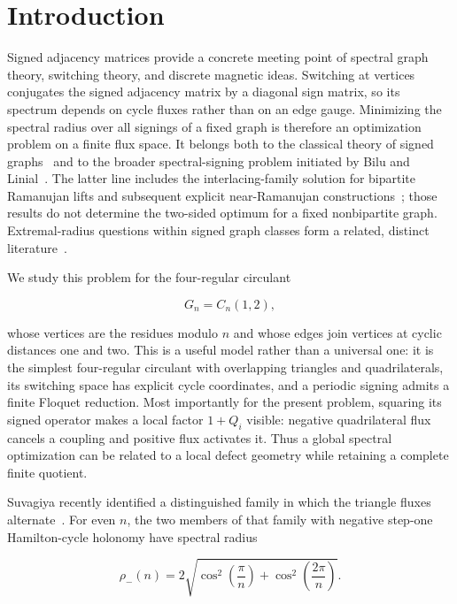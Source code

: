 \section{Introduction}\label{sec:introduction}

Signed adjacency matrices provide a concrete meeting point of spectral graph
theory, switching theory, and discrete magnetic ideas. Switching at vertices
conjugates the signed adjacency matrix by a diagonal sign matrix, so its
spectrum depends on cycle fluxes rather than on an edge gauge. Minimizing the
spectral radius over all signings of a fixed graph is therefore an optimization
problem on a finite flux space. It belongs both to the classical theory of
signed graphs~\cite{Zaslavsky1982} and to the broader spectral-signing problem
initiated by Bilu and Linial~\cite{BiluLinial2006}. The latter line includes the
interlacing-family solution for bipartite Ramanujan lifts and subsequent
explicit near-Ramanujan constructions~\cite{MarcusSpielmanSrivastava2015,MohantyODonnellParedes2022};
those results do not determine the two-sided optimum for a fixed nonbipartite
graph. Extremal-radius questions within signed graph classes form a related,
distinct literature~\cite{BelardoCioabaKoolenWang2019,BelardoBrunettiCiampella2021}.

We study this problem for the four-regular circulant

\begin{equation}
G_n=C_n(1,2),
\end{equation}

whose vertices are the residues modulo \(n\) and whose edges join vertices at
cyclic distances one and two. This is a useful model rather than a universal
one: it is the simplest four-regular circulant with overlapping triangles and
quadrilaterals, its switching space has explicit cycle coordinates, and a
periodic signing admits a finite Floquet reduction. Most importantly for the
present problem, squaring its signed operator makes a local factor \(1+Q_i\)
visible: negative quadrilateral flux cancels a coupling and positive flux
activates it. Thus a global spectral optimization can be related to a local
defect geometry while retaining a complete finite quotient.

Suvagiya recently identified a distinguished family in which the triangle
fluxes alternate~\cite{Suvagiya2026Signed}. For even \(n\), the two members of that
family with negative step-one Hamilton-cycle holonomy have spectral radius

\begin{equation}
\rho_-(n)=2 \sqrt{\cos^{2}(\frac{\pi}{n})+\cos^{2}(\frac{2\pi}{n})}.
\end{equation}

